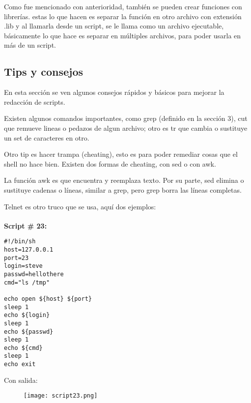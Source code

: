 \documentclass[a4paper]{article}
\begin{document}
Como fue mencionado con anterioridad, también se pueden crear funciones con librerías. estas lo que hacen es separar la función en otro archivo con extensión .lib y al llamarla desde un script, se le llama como un archivo ejecutable, básicamente lo que hace es separar en múltiples archivos, para poder usarla en más de un script.

\subsection{Tips y consejos}
En esta sección se ven algunos consejos rápidos y básicos para mejorar la redacción de scripts. 

Existen algunos comandos importantes, como grep (definido en la sección 3), cut que remueve lineas o pedazos de algun archivo; otro es tr que cambia o sustituye un set de caracteres en otro.

Otro tip es hacer trampa (cheating), esto es para poder remediar cosas que el shell no hace bien. Existen dos formas de cheating, con sed o con awk. 

La función awk es que encuentra y reemplaza texto. Por su parte, sed elimina o sustituye cadenas o líneas, similar a grep, pero grep borra las líneas completas. 

Telnet es otro truco que se usa, aquí dos ejemplos:\\
\\
\textbf{Script \# 23:}
\begin{verbatim}
#!/bin/sh
host=127.0.0.1
port=23
login=steve
passwd=hellothere
cmd="ls /tmp"

echo open ${host} ${port}
sleep 1
echo ${login}
sleep 1
echo ${passwd}
sleep 1
echo ${cmd}
sleep 1
echo exit
\end{verbatim}

Con salida: 
 \begin{figure}[h!]
  \texttt{[image: script23.png]}
  \centering
  \label{fig:36}
\end{figure}
\end{document}
